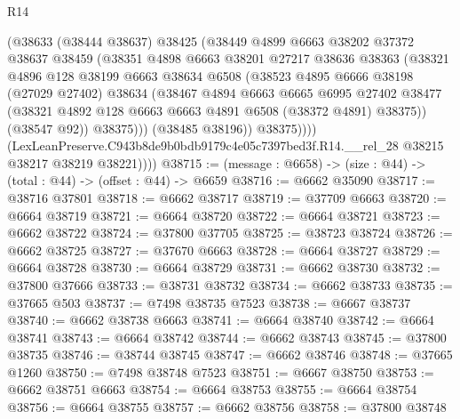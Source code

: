 \begin{lexlean}{R14}
\begin{coremodule}
                  (@38633
                    (@38444 @38637)
                    @38425
                    (@38449
                      @4899
                      @6663
                      @38202
                      @37372
                      @38637
                      @38459
                      (@38351
                        @4898
                        @6663
                        @38201
                        @27217
                        @38636
                        @38363
                        (@38321
                          @4896
                          @128
                          @38199
                          @6663
                          @38634
                          @6508
                          (@38523
                            @4895
                            @6666
                            @38198
                            (@27029 @27402)
                            @38634
                            (@38467
                              @4894
                              @6663
                              @6665
                              @6995
                              @27402
                              @38477
                              (@38321 @4892 @128 @6663 @6663 @4891 @6508 (@38372 @4891) @38375))
                            (@38547 @92))
                          @38375)))
                    (@38485 @38196))
                  @38375))))
          (LexLeanPreserve.C943b8de9b0bdb9179c4e05c7397bed3f.R14.__rel_28
            @38215
            @38217
            @38219
            @38221))))
@38715 := (message : @6658) -> (size : @44) -> (total : @44) -> (offset : @44) -> @6659
@38716 := @6662 @35090
@38717 := @38716 @37801
@38718 := @6662 @38717
@38719 := @37709 @6663
@38720 := @6664 @38719
@38721 := @6664 @38720
@38722 := @6664 @38721
@38723 := @6662 @38722
@38724 := @37800 @37705
@38725 := @38723 @38724
@38726 := @6662 @38725
@38727 := @37670 @6663
@38728 := @6664 @38727
@38729 := @6664 @38728
@38730 := @6664 @38729
@38731 := @6662 @38730
@38732 := @37800 @37666
@38733 := @38731 @38732
@38734 := @6662 @38733
@38735 := @37665 @503
@38737 := @7498 @38735 @7523
@38738 := @6667 @38737
@38740 := @6662 @38738 @6663
@38741 := @6664 @38740
@38742 := @6664 @38741
@38743 := @6664 @38742
@38744 := @6662 @38743
@38745 := @37800 @38735
@38746 := @38744 @38745
@38747 := @6662 @38746
@38748 := @37665 @1260
@38750 := @7498 @38748 @7523
@38751 := @6667 @38750
@38753 := @6662 @38751 @6663
@38754 := @6664 @38753
@38755 := @6664 @38754
@38756 := @6664 @38755
@38757 := @6662 @38756
@38758 := @37800 @38748

\end{coremodule}
\end{lexlean}

